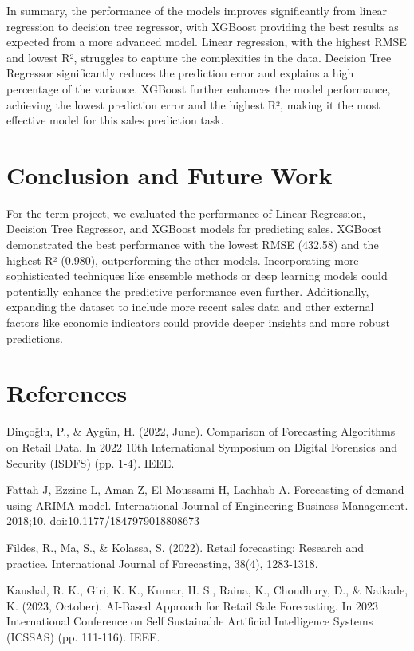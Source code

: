 \documentclass[12pt]{report}
\begin{document}
In summary, the performance of the models improves significantly from linear regression to decision tree regressor, with XGBoost providing the best results as expected from a more advanced model. Linear regression, with the highest RMSE and lowest R², struggles to capture the complexities in the data. Decision Tree Regressor significantly reduces the prediction error and explains a high percentage of the variance. XGBoost further enhances the model performance, achieving the lowest prediction error and the highest R², making it the most effective model for this sales prediction task.




\chapter{Conclusion and Future Work}

For the term project, we evaluated the performance of Linear Regression, Decision Tree Regressor, and XGBoost models for predicting sales. XGBoost demonstrated the best performance with the lowest RMSE (432.58) and the highest R² (0.980), outperforming the other models. Incorporating more sophisticated techniques like ensemble methods or deep learning models could potentially enhance the predictive performance even further. Additionally, expanding the dataset to include more recent sales data and other external factors like economic indicators could provide deeper insights and more robust predictions.

\chapter*{References}

Dinçoğlu, P., \& Aygün, H. (2022, June). Comparison of Forecasting Algorithms on Retail Data. In 2022 10th International Symposium on Digital Forensics and Security (ISDFS) (pp. 1-4). IEEE.

Fattah J, Ezzine L, Aman Z, El Moussami H, Lachhab A. Forecasting of demand using ARIMA model. International Journal of Engineering Business Management. 2018;10. doi:10.1177/1847979018808673

Fildes, R., Ma, S., \& Kolassa, S. (2022). Retail forecasting: Research and practice. International Journal of Forecasting, 38(4), 1283-1318.

Kaushal, R. K., Giri, K. K., Kumar, H. S., Raina, K., Choudhury, D., \& Naikade, K. (2023, October). AI-Based Approach for Retail Sale Forecasting. In 2023 International Conference on Self Sustainable Artificial Intelligence Systems (ICSSAS) (pp. 111-116). IEEE.
\end{document}
